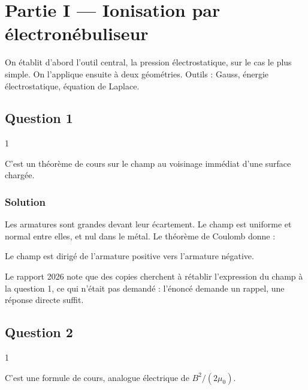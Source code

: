 \documentclass[11pt,a4paper]{article}
\newcommand{\equationajustee}[1]{%
  \sbox{\boiteequation}{$\displaystyle #1$}%
  \ifdim\wd\boiteequation>\linewidth
    \[\resizebox{\linewidth}{!}{\usebox{\boiteequation}}\]%
  \else
    \[#1\]%
  \fi}
\begin{document}
\hypertarget{partie-i-ionisation-par-uxe9lectronuxe9buliseur}{%
\section{Partie I --- Ionisation par électronébuliseur}\label{partie-i-ionisation-par-uxe9lectronuxe9buliseur}}

On établit d'abord l'outil central, la pression électrostatique, sur le cas le plus simple. On l'applique ensuite à deux géométries. Outils : Gauss, énergie électrostatique, équation de Laplace.

\hypertarget{question-1}{%
\subsection{Question 1}\label{question-1}}

\begin{indication}{1}

C'est un théorème de cours sur le champ au voisinage immédiat d'une surface chargée.

\end{indication}

\hypertarget{solution}{%
\subsubsection{Solution}\label{solution}}

Les armatures sont grandes devant leur écartement. Le champ est uniforme et normal entre elles, et nul dans le métal. Le théorème de Coulomb donne :

\equationajustee{\boxed{E=\frac{\sigma}{\varepsilon_0}}}

Le champ est dirigé de l'armature positive vers l'armature négative.

\begin{jury}

Le rapport 2026 note que des copies cherchent à rétablir l'expression du champ à la question 1, ce qui n'était pas demandé : l'énoncé demande un rappel, une réponse directe suffit.

\end{jury}

\hypertarget{question-2}{%
\subsection{Question 2}\label{question-2}}

\begin{indication}{1}

C'est une formule de cours, analogue électrique de \(B^2/(2\mu_0)\).

\end{indication}
\end{document}
